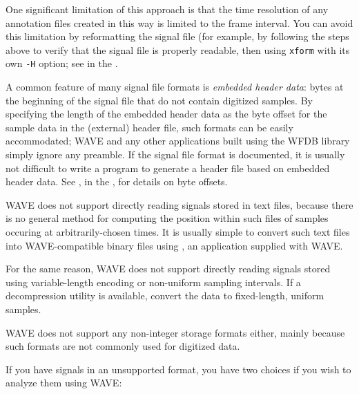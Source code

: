 \documentclass[twoside]{book}
\newcommand{\WAVE}{{\sf WAVE}\xspace}
\begin{document}
One significant limitation of this approach is that the time
resolution of any annotation files created in this way is limited to
the frame interval.  You can avoid this limitation by reformatting the
signal file (for example, by following the steps above to verify that
the signal file is properly readable, then using {\tt xform} with its
own {\tt -H} option; see
in the
.

A common feature of many signal file formats is \emph{embedded header
data}:  bytes at the beginning of the signal file that do not contain
digitized samples.  By specifying the length of the embedded header
data as the byte offset for the sample data in the (external) header
file, such formats can be easily accommodated;  \WAVE{} and any other
applications built using the WFDB library simply ignore any preamble.
If the signal file format is documented, it is usually not difficult to
write a program to generate a header file based on embedded header
data.  See
, in the 
,
for details on byte offsets.

\WAVE{} does not support directly reading signals stored in text files, because
there is no general method for computing the position within such files of
samples occuring at arbitrarily-chosen times.  It is usually simple to convert
such text files into \WAVE{}-compatible binary files using
,
an application supplied with \WAVE{}.

For the same reason, \WAVE{} does not support directly reading signals stored
using variable-length encoding or non-uniform sampling intervals.  If a
decompression utility is available, convert the data to fixed-length, uniform
samples.

\WAVE{} does not support any non-integer storage formats either, mainly because
such formats are not commonly used for digitized data.

If you have signals in an unsupported format, you have two choices if you wish
to analyze them using \WAVE{}:
\end{document}
